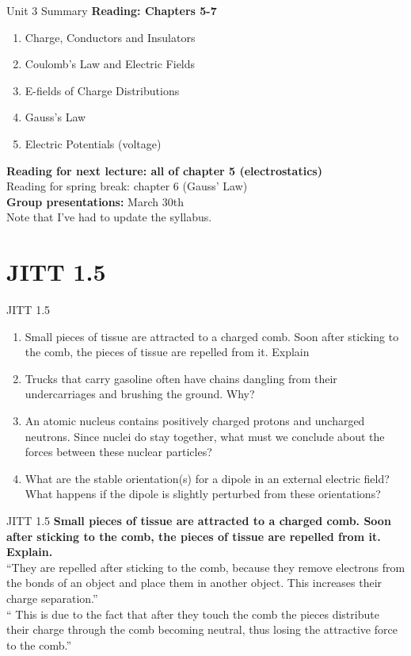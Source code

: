\documentclass{beamer}
\begin{document}
\begin{frame}{Unit 3 Summary}
\textbf{Reading: Chapters 5-7}
\begin{enumerate}
\item Charge, Conductors and Insulators
\item Coulomb's Law and Electric Fields
\item E-fields of Charge Distributions
\item Gauss's Law
\item Electric Potentials (voltage)
\end{enumerate}
\textbf{Reading for next lecture: all of chapter 5 (electrostatics)} \\ 
\alert{Reading for spring break: chapter 6 (Gauss' Law)} \\
\alert{\textbf{Group presentations:} March 30th} \\
Note that I've had to update the syllabus.
\end{frame}

\section{JITT 1.5}

\begin{frame}{JITT 1.5}
\begin{enumerate}
\item Small pieces of tissue are attracted to a charged comb. Soon after sticking to the comb, the pieces of tissue are repelled from it. Explain
\item Trucks that carry gasoline often have chains dangling from their undercarriages and brushing the ground. Why?
\item An atomic nucleus contains positively charged protons and uncharged neutrons. Since nuclei do stay together, what must we conclude about the forces between these nuclear particles?
\item What are the stable orientation(s) for a dipole in an external electric field? What happens if the dipole is slightly perturbed from these orientations?
\end{enumerate}
\end{frame}

\begin{frame}{JITT 1.5}
\textbf{Small pieces of tissue are attracted to a charged comb. Soon after sticking to the comb, the pieces of tissue are repelled from it. Explain.} \\
``They are repelled after sticking to the comb, because they remove electrons from the bonds of an object and place them in another object. This increases their charge separation.'' \\
`` This is due to the fact that after they touch the comb the pieces distribute their charge through the comb becoming neutral, thus losing the attractive force to the comb.'' 
\end{frame}
\end{document}

